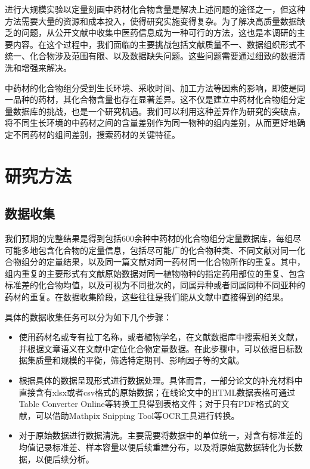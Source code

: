 进行大规模实验以定量刻画中药材化合物含量是解决上述问题的途径之一，但这种方法需要大量的资源和成本投入，使得研究实施变得复杂。为了解决高质量数据缺乏的问题，从公开文献中收集中医药信息成为一种可行的方法，这也是本调研的主要内容。在这个过程中，我们面临的主要挑战包括文献质量不一、数据组织形式不统一、化合物涉及范围有限、以及数据缺失问题。这些问题需要通过细致的数据清洗和增强来解决。

中药材的化合物组分受到生长环境、采收时间、加工方法等因素的影响，即使是同一品种的药材，其化合物含量也存在显著差异。这不仅是建立中药材化合物组分定量数据库的挑战，也是一个研究机遇。我们可以利用这种差异作为研究的突破点，将不同生长环境的中药材之间的含量差别作为同一物种的组内差别，从而更好地确定不同药材的组间差别，搜索药材的关键特征。

\section{研究方法}

\subsection{数据收集}

我们预期的完整结果是得到包括600余种中药材的化合物组分定量数据库，每组尽可能多地包含化合物的定量信息，包括尽可能广的化合物种类、不同文献对同一化合物组分的定量结果，以及同一篇文献对同一药材同一化合物所作的重复。其中，组内重复的主要形式有文献原始数据对同一植物物种的指定药用部位的重复、包含标准差的化合物均值，以及可视为不同批次的，同属异种或者同属同种不同亚种的药材的重复。在数据收集阶段，这些往往是我们能从文献中直接得到的结果。

具体的数据收集任务可以分为如下几个步骤：

\begin{itemize}
  \item 使用药材名或专有拉丁名称，或者植物学名，在文献数据库中搜索相关文献，并根据文章语义在文献中定位化合物定量数据。在此步骤中，可以依据目标数据集质量和规模的平衡，筛选特定期刊、影响因子等的文献。
  \item 根据具体的数据呈现形式进行数据处理。具体而言，一部分论文的补充材料中直接含有xlsx或者csv格式的原始数据；在线论文中的HTML数据表格可通过Table Converter Online等转换工具得到表格文件；对于只有PDF格式的文献，可以借助Mathpix Snipping Tool等OCR工具进行转换。
  \item 对于原始数据进行数据清洗。主要需要将数据中的单位统一，对含有标准差的均值记录标准差、样本容量以便后续重建分布，以及将原始宽数据转化为长数据，以便后续分析。
\end{itemize}

